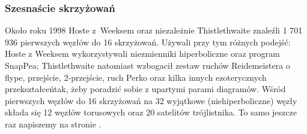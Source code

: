 
\subsubsection{Szesnaście skrzyżowań}
Około roku 1998 Hoste z~Weeksem oraz niezależnie Thistlethwaite \cite{thistlethwaite1998} znaleźli 1 701 936 pierwszych węzłów do 16 skrzyżowań.
%
%
%
Używali przy tym różnych podejść: Hoste z Weeksem wykorzystywali niezmienniki hiperboliczne oraz program SnapPea; Thistlethwaite natomiast wzbogacił zestaw ruchów Reidemeistera o flype, przejście, 2-przejście, ruch Perko oraz kilka innych ezoterycznych przekształceńtak, żeby poradzić sobie z upartymi parami diagramów.
Wśród pierwszych węzłów do 16 skrzyżowań na 32 wyjątkowe (niehiperboliczne) węzły składa się 12 węzłów torusowych oraz 20 satelitów trójlistnika.
To samo jeszcze raz napiszemy na stronie \pageref{page:nonhyperbolic_below_16}.

